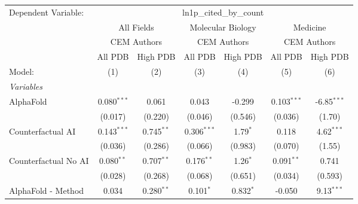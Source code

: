\begingroup
\centering
\begin{tabular}{lcccccc}
   \tabularnewline \midrule \midrule
   Dependent Variable: & \multicolumn{6}{c}{ln1p\_cited\_by\_count}\\
 & \multicolumn{2}{c}{All Fields} & \multicolumn{2}{c}{Molecular Biology} & \multicolumn{2}{c}{Medicine} \\
\cmidrule(lr){2-3} \cmidrule(lr){4-5} \cmidrule(lr){6-7}
 & \multicolumn{2}{c}{CEM Authors} & \multicolumn{2}{c}{CEM Authors} & \multicolumn{2}{c}{CEM Authors} \\
\cmidrule(lr){2-3} \cmidrule(lr){4-5} \cmidrule(lr){6-7}
 & \multicolumn{1}{c}{All PDB} & \multicolumn{1}{c}{High PDB} & \multicolumn{1}{c}{All PDB} & \multicolumn{1}{c}{High PDB} & \multicolumn{1}{c}{All PDB} & \multicolumn{1}{c}{High PDB} \\
\cmidrule(lr){2-2} \cmidrule(lr){3-3} \cmidrule(lr){4-4} \cmidrule(lr){5-5} \cmidrule(lr){6-6} \cmidrule(lr){7-7}
   Model:                                                     & (1)           & (2)           & (3)           & (4)         & (5)           & (6)\\  
   \midrule
   \emph{Variables}\\
   AlphaFold                                                  & 0.080$^{***}$ & 0.061         & 0.043         & -0.299      & 0.103$^{***}$ & -6.85$^{***}$\\   
                                                              & (0.017)       & (0.220)       & (0.046)       & (0.546)     & (0.036)       & (1.70)\\   
   Counterfactual AI                                          & 0.143$^{***}$ & 0.745$^{**}$  & 0.306$^{***}$ & 1.79$^{*}$  & 0.118         & 4.62$^{***}$\\   
                                                              & (0.036)       & (0.286)       & (0.066)       & (0.983)     & (0.070)       & (1.55)\\   
   Counterfactual No AI                                       & 0.080$^{**}$  & 0.707$^{**}$  & 0.176$^{**}$  & 1.26$^{*}$  & 0.091$^{**}$  & 0.741\\   
                                                              & (0.028)       & (0.268)       & (0.068)       & (0.651)     & (0.034)       & (0.593)\\   
   AlphaFold - Method                                         & 0.034         & 0.280$^{**}$  & 0.101$^{*}$   & 0.832$^{*}$ & -0.050        & 9.13$^{***}$\\   

\end{tabular}
